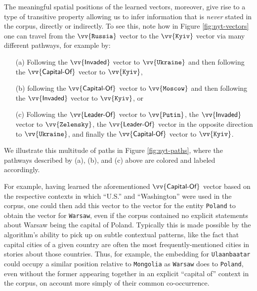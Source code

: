 \documentclass[11pt]{article}
\newcommand{\entity}[1]{\texttt{#1}}
\begin{document}


The meaningful spatial positions of the learned vectors, moreover, give rise to a type of transitive property allowing us to infer information that is \textit{never} stated in the corpus, directly or indirectly. To see this, note how in Figure \ref{fig:nyt-vectors} one can travel from the $\vv{\texttt{Russia}}$ vector to the $\vv{\texttt{Kyiv}}$ vector via many different pathways, for example by:
	\begin{enumerate}
		\item[(a)] Following the $\vv{\textsf{Invaded}}$ vector to $\vv{\texttt{Ukraine}}$ and then following the $\vv{\textsf{Capital-Of}}$ vector to $\vv{\texttt{Kyiv}}$,
		\item[(b)] following the $\vv{\textsf{Capital-Of}}$ vector to $\vv{\texttt{Moscow}}$ and then following the $\vv{\textsf{Invaded}}$ vector to $\vv{\texttt{Kyiv}}$, or
		\item[(c)] Following the $\vv{\textsf{Leader-Of}}$ vector to $\vv{\texttt{Putin}}$, the $\vv{\textsf{Invaded}}$ vector to $\vv{\texttt{Zelensky}}$, the $\vv{\textsf{Leader-Of}}$ vector in the opposite direction to $\vv{\texttt{Ukraine}}$, and finally the $\vv{\textsf{Capital-Of}}$ vector to $\vv{\texttt{Kyiv}}$.
	\end{enumerate}
We illustrate this multitude of paths in Figure \ref{fig:nyt-paths}, where the pathways described by (a), (b), and (c) above are colored and labeled accordingly.
	
For example, having learned the aforementioned $\vv{\textsf{Capital-Of}}$ vector based on the respective contexts in which ``U.S.'' and ``Washington'' were used in the corpus, one could then add this vector to the vector for the entity \entity{Poland} to obtain the vector for \entity{Warsaw}, even if the corpus contained no explicit statements about Warsaw being the capital of Poland. Typically this is made possible by the algorithm's ability to pick up on subtle contextual patterns, like the fact that capital cities of a given country are often the most frequently-mentioned cities in stories about those countries. Thus, for example, the embedding for \entity{Ulaanbaatar} could occupy a similar position relative to \entity{Mongolia} as \entity{Warsaw} does to \entity{Poland}, even without the former appearing together in an explicit ``capital of'' context in the corpus, on account more simply of their common co-occurrence.
\end{document}
